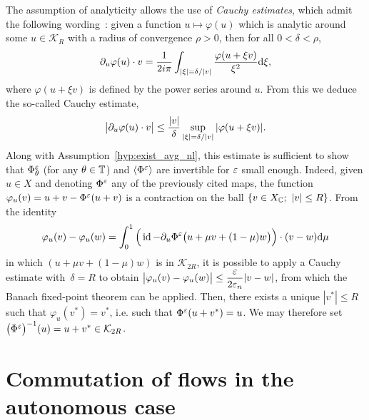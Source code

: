 The assumption of analyticity allows the use of \textit{Cauchy
estimates}, which admit the following wording~: given a function $u
\mapsto \varphi(u)$ which is analytic around some $u \in \mathcal{K}_R$
with a radius of convergence $\rho > 0$, then for all $0 < \delta <
\rho$, 
\begin{equation*}
  \partial_u \varphi(u) \cdot v = \frac{1}{2i\pi}
    \int_{|\xi| = \delta/|v|} \frac{\varphi(u+\xi v)}{\xi^2} \mathrm{d} \xi ,
\end{equation*}
where $\varphi(u + \xi v)$ is defined by the power series around $u$.
From this we deduce the so-called Cauchy estimate,
\begin{equation} \label{sec:intro:eq:cauchy}
  \big| \partial_u \varphi(u) \cdot v \big| 
  \leq \frac{|v|}{\delta} 
    \sup_{|\xi| = \delta/|v|} |\varphi(u + \xi v)| .
\end{equation}
Along with Assumption~\ref{hyp:exist_avg_nl}, this estimate is
sufficient to show that $\Phi^\varepsilon _\theta$ (for any $\theta \in \mathbb{T}$)
and $\langle \Phi^\varepsilon \rangle$ are invertible for $\varepsilon$ small enough. Indeed,
given $u \in X$ and denoting $\Phi^\varepsilon$ any of the previously cited
maps, the function $\varphi_u(v) = u + v - \Phi^\varepsilon(u+v)$ is a
contraction on the ball $\{ v \in X_{\mathbb{C}};\ |v| \leq R \}$. From the
identity
\begin{equation*}
  \varphi_u(v) - \varphi_u(w)
  = \int_0^1 \Big(
    \operatorname{id} - \partial_u \Phi^\varepsilon \big(u + \mu v + (1 - \mu) w \big)
  \Big) \cdot (v - w) \mathrm{d}\mu 
\end{equation*}
in which $(u + \mu v + (1-\mu)w)$ is in $\mathcal{K}_{2R}$, it is
possible to apply a Cauchy estimate with~$\delta = R$ to obtain
$\displaystyle \big| \varphi_u (v) - \varphi_u (w) \big| \leq
\frac{\varepsilon}{2\varepsilon_n} |v-w|$, from which the Banach fixed-point theorem
can be applied. Then, there exists a unique $|v^*| \leq R$ such that
$\varphi_u(v^*) = v^*$, i.e. such that $\Phi^\varepsilon(u + v^*) = u$. We may
therefore set $\big(\Phi^\varepsilon \big) ^{-1} (u) = u + v^* \in
\mathcal{K}_{2R}$.


\section{Commutation of flows in the autonomous case} 
\label{sec:autonomous}

